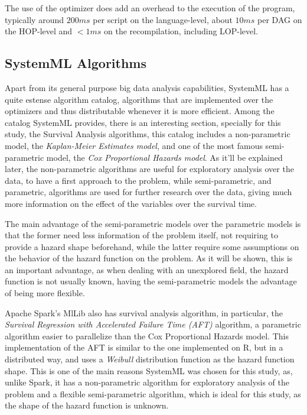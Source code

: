 \documentclass[11pt]{book} %
\begin{document}
      The use of the optimizer does add an overhead to the execution of the program, typically around $200ms$ per script on the language-level, about $10ms$ per DAG on the HOP-level and $<1ms$ on the recompilation, including LOP-level.

    \subsection{SystemML Algorithms}

      Apart from its general purpose big data analysis capabilities, SystemML has a quite estense algorithm catalog, algorithms that are implemented over the optimizers and thus distributable whenever it is more efficient. Among the catalog SystemML provides, there is an interesting section, specially for this study, the Survival Analysis algorithms, this catalog includes a non-parametric model, the \emph{Kaplan-Meier Estimates model}, and one of the most famous semi-parametric model, the \emph{Cox Proportional Hazards model}. As it'll be explained later, the non-parametric algorithms are useful for exploratory analysis over the data, to have a first approach to the problem, while semi-parametric, and parametric, algorithms are used for further research over the data, giving much more information on the effect of the variables over the survival time.

      The main advantage of the semi-parametric models over the parametric models is that the former need less information of the problem itself, not requiring to provide a hazard shape beforehand, while the latter require some assumptions on the behavior of the hazard function on the problem. As it will be shown, this is an important advantage, as when dealing with an unexplored field, the hazard function is not usually known, having the semi-parametric models the advantage of being more flexible.

      Apache Spark's MlLib also has survival analysis algorithm, in particular, the \emph{Survival Regression with Accelerated Failure Time (AFT)} algorithm, a parametric algorithm easier to parallelize than the Cox Proportional Hazards model. This implementation of the AFT is similar to the one implemented on R, but in a distributed way, and uses a \emph{Weibull} distribution function as the hazard function shape. This is one of the main reasons SystemML was chosen for this study, as, unlike Spark, it has a non-parametric algorithm for exploratory analysis of the problem and a flexible semi-parametric algorithm, which is ideal for this study, as the shape of the hazard function is unknown.
\end{document}
